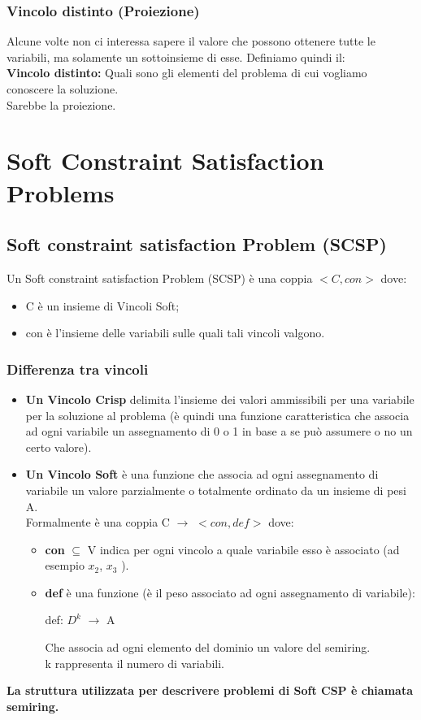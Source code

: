 \subsection{Vincolo distinto (Proiezione)}
Alcune volte non ci interessa sapere il valore che possono ottenere tutte le variabili, ma solamente un sottoinsieme di esse. Definiamo quindi il: 
\\
\textbf{Vincolo distinto:} Quali sono gli elementi del problema di cui vogliamo conoscere la soluzione.
\\Sarebbe la proiezione.
\chapter{Soft Constraint Satisfaction Problems} \label{ch:Soft Constraint Satisfaction Problems}
\section{Soft constraint satisfaction Problem (SCSP)}
Un Soft constraint satisfaction Problem (SCSP) è una coppia $<C, con>$ dove:
\begin{itemize}
    \item C è un insieme di Vincoli Soft;
    \item con è l’insieme delle variabili sulle quali tali vincoli valgono.
\end{itemize}
\newpage
\subsection{Differenza tra vincoli}
\begin{itemize}
    \item \textbf{Un Vincolo Crisp} delimita l’insieme dei valori ammissibili per una variabile per la soluzione al problema (è quindi una funzione caratteristica che associa ad ogni variabile un assegnamento di 0 o 1 in base a se può assumere o no un certo valore).
    
    \item \textbf{Un Vincolo Soft} è una funzione che associa ad ogni assegnamento di variabile un valore parzialmente o totalmente ordinato da un insieme di pesi A.
    \\Formalmente è una coppia C $\rightarrow$ $<con, def>$ dove:
    
    \begin{itemize}
        \item \textbf{con} $\subseteq$ V indica per ogni vincolo a quale variabile esso è associato (ad esempio $x_2 $, $x_3$ ).
        \item \textbf{def} è una funzione (è il peso associato ad ogni assegnamento di variabile):
        \begin{center}
            def: $D^k$ $\rightarrow$ A
            
            Che associa ad ogni elemento del dominio un valore del semiring. 
            \\k rappresenta il numero di variabili.
        \end{center}
    \end{itemize}
\end{itemize}
\textbf{La struttura utilizzata per descrivere problemi di Soft CSP è chiamata semiring.}
\newpage
